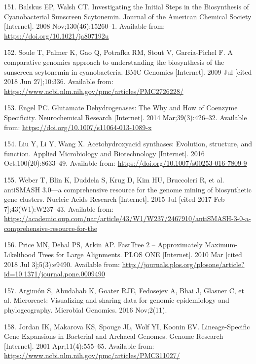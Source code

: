 \documentclass[12pt,twoside]{reedthesis}
\begin{document}
  \hypertarget{ref-balskus_investigating_2008}{}
  151. Balskus EP, Walsh CT. Investigating the Initial Steps in the
  Biosynthesis of Cyanobacterial Sunscreen Scytonemin. Journal of the
  American Chemical Society {[}Internet{]}. 2008 Nov;130(46):15260--1.
  Available from: \url{https://doi.org/10.1021/ja807192u}
  
  \hypertarget{ref-soule_comparative_2009}{}
  152. Soule T, Palmer K, Gao Q, Potrafka RM, Stout V, Garcia-Pichel F. A
  comparative genomics approach to understanding the biosynthesis of the
  sunscreen scytonemin in cyanobacteria. BMC Genomics {[}Internet{]}. 2009
  Jul {[}cited 2018 Jun 27{]};10:336. Available from:
  \url{https://www.ncbi.nlm.nih.gov/pmc/articles/PMC2726228/}
  
  \hypertarget{ref-engel_glutamate_2014}{}
  153. Engel PC. Glutamate Dehydrogenases: The Why and How of Coenzyme
  Specificity. Neurochemical Research {[}Internet{]}. 2014
  Mar;39(3):426--32. Available from:
  \url{https://doi.org/10.1007/s11064-013-1089-x}
  
  \hypertarget{ref-liu_acetohydroxyacid_2016}{}
  154. Liu Y, Li Y, Wang X. Acetohydroxyacid synthases: Evolution,
  structure, and function. Applied Microbiology and Biotechnology
  {[}Internet{]}. 2016 Oct;100(20):8633--49. Available from:
  \url{https://doi.org/10.1007/s00253-016-7809-9}
  
  \hypertarget{ref-weber_antismash3_2015}{}
  155. Weber T, Blin K, Duddela S, Krug D, Kim HU, Bruccoleri R, et al.
  antiSMASH 3.0---a comprehensive resource for the genome mining of
  biosynthetic gene clusters. Nucleic Acids Research {[}Internet{]}. 2015
  Jul {[}cited 2017 Feb 7{]};43(W1):W237--43. Available from:
  \url{https://academic.oup.com/nar/article/43/W1/W237/2467910/antiSMASH-3-0-a-comprehensive-resource-for-the}
  
  \hypertarget{ref-price_fasttree_2010}{}
  156. Price MN, Dehal PS, Arkin AP. FastTree 2 -- Approximately
  Maximum-Likelihood Trees for Large Alignments. PLOS ONE {[}Internet{]}.
  2010 Mar {[}cited 2018 Jul 3{]};5(3):e9490. Available from:
  \url{http://journals.plos.org/plosone/article?id=10.1371/journal.pone.0009490}
  
  \hypertarget{ref-argimon_microreact_2016}{}
  157. Argimón S, Abudahab K, Goater RJE, Fedosejev A, Bhai J, Glasner C,
  et al. Microreact: Visualizing and sharing data for genomic epidemiology
  and phylogeography. Microbial Genomics. 2016 Nov;2(11).
  
  \hypertarget{ref-jordan_lineage-specific_2001}{}
  158. Jordan IK, Makarova KS, Spouge JL, Wolf YI, Koonin EV.
  Lineage-Specific Gene Expansions in Bacterial and Archaeal Genomes.
  Genome Research {[}Internet{]}. 2001 Apr;11(4):555--65. Available from:
  \url{https://www.ncbi.nlm.nih.gov/pmc/articles/PMC311027/}
  
\end{document}
